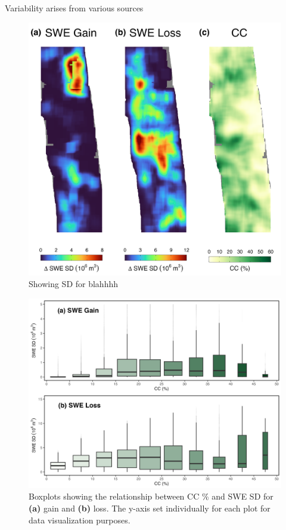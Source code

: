 Variability arises from various sources

\clearpage
\begin{figure}[t]
\centering
\includegraphics[width=\textwidth]{figures/ch4_figs/sd_vs_cc_map_55x55.png}
\centering
\caption{Showing SD for blahhhh}
\end{figure}

\clearpage
\begin{figure}[t]
\centering
\includegraphics[width=\textwidth]{figures/ch4_figs/swe_sd_bp_55x55.png}
\centering
\caption{Boxplots showing the relationship between CC \% and SWE SD for \textbf{(a)} gain and \textbf{(b)} loss. The y-axis set individually for each plot for data visualization purposes.}
\end{figure}

